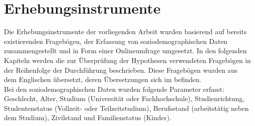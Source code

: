 \section{Erhebungsinstrumente}\label{section.erhebungsinstrumente}
Die Erhebungsinstrumente der vorliegenden Arbeit wurden basierend auf bereits existierenden Fragebögen, der Erfassung von soziodemographischen Daten zusammengestellt und in Form einer Onlineumfrage umgesetzt. In den folgenden Kapiteln werden die zur Überprüfung der Hypothesen verwendeten Fragebögen in der Reihenfolge der Durchführung beschrieben. Diese Fragebögen wurden aus dem Englischen übersetzt, deren Übersetzungen sich im  befinden. \\
Bei den soziodemographischen Daten wurden folgende Parameter erfasst: Geschlecht, Alter, Studium (Universität oder Fachhochschule), Studienrichtung, Studentenstatus (Vollzeit- oder Teilzeitstudium), Berufsstand (arbeitstätig neben dem Studium), Zivilstand und Familienstatus (Kinder). \\
